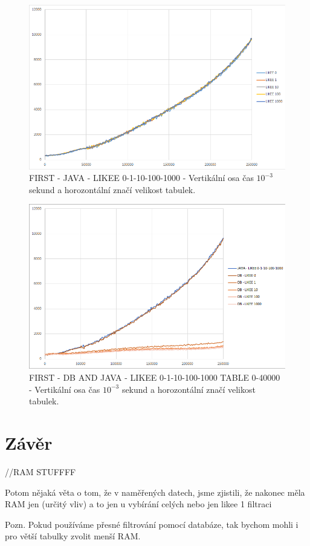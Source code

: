 \documentclass[a4paper, 11pt]{article}
\begin{document}
\begin{figure}[H]
\centering
\includegraphics[width=150mm, frame]{images/FIRST-JAVA.png}
\caption{FIRST - JAVA - LIKEE 0-1-10-100-1000 - Vertikální osa čas $10^{-3}$ sekund a horozontální značí velikost tabulek.}
\label{sec:obr6}
\end{figure}

\begin{figure}[H]
\centering
\includegraphics[width=150mm, frame]{images/FIRST-DB-JAVA-INTERSECTION.png}
\caption{FIRST - DB AND JAVA - LIKEE 0-1-10-100-1000 TABLE 0-40000 - Vertikální osa čas $10^{-3}$ sekund a horozontální značí velikost tabulek.}
\label{sec:obr4}
\end{figure}



\section{Závěr}

//RAM STUFFFF

Potom nějaká věta o tom, že v naměřených datech, jsme zjistili, že nakonec měla RAM jen (určitý vliv) a to jen u vybírání celých nebo jen likee 1 filtraci

Pozn. Pokud používáme přesné filtrování pomocí databáze, tak bychom mohli i pro větší tabulky zvolit menší RAM. 


\pagebreak
\newpage

\def\refname{Literatura}

\end{document}
